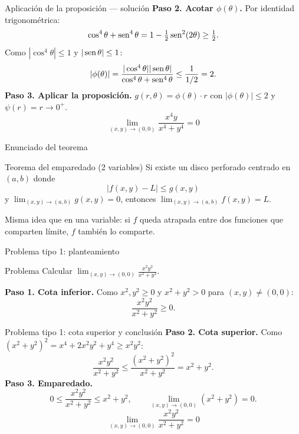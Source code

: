\documentclass[11pt,aspectratio=169]{beamer}
\begin{document}
\begin{frame}{Aplicación de la proposición --- solución}
  \textbf{Paso 2. Acotar $\phi(\theta)$.} Por identidad trigonométrica:
  \[
    \cos^4\theta+\operatorname{sen}^4\theta=1-\tfrac12\operatorname{sen}^2(2\theta)\ge\tfrac12.
  \]
  \pause
  Como $|\cos^4\theta|\le 1$ y $|\operatorname{sen}\theta|\le 1$:
  \[
    |\phi(\theta)|=\frac{|\cos^4\theta||\operatorname{sen}\theta|}{\cos^4\theta+\operatorname{sen}^4\theta}\le\frac{1}{1/2}=2.
  \]
  \pause
  \textbf{Paso 3. Aplicar la proposición.} $g(r,\theta)=\phi(\theta)\cdot r$ con $|\phi(\theta)|\le 2$ y $\psi(r)=r\to 0^+$.
  \pause
  \[
    \boxed{\lim_{(x,y)\to(0,0)}\frac{x^4y}{x^4+y^4}=0}
  \]
\end{frame}


\begin{frame}{Enunciado del teorema}
  \begin{block}{Teorema del emparedado (2 variables)}
    Si existe un disco perforado centrado en $(a,b)$ donde
    \[
      |f(x,y)-L|\le g(x,y)
    \]
    y $\displaystyle\lim_{(x,y)\to(a,b)} g(x,y)=0$, entonces $\displaystyle\lim_{(x,y)\to(a,b)} f(x,y)=L$.
  \end{block}
  \pause
  \begin{center}
  \normalsize Misma idea que en una variable: si $f$ queda atrapada entre dos funciones que comparten límite, $f$ también lo comparte.
  \end{center}
  \pause
\end{frame}

\begin{frame}{Problema tipo 1: planteamiento}
  \begin{block}{Problema}
    Calcular $\displaystyle\lim_{(x,y)\to(0,0)}\frac{x^2y^2}{x^2+y^2}$.
  \end{block}
  \pause
  \textbf{Paso 1. Cota inferior.} Como $x^2,y^2\ge 0$ y $x^2+y^2>0$ para $(x,y)\neq(0,0)$:
  \[
    \frac{x^2y^2}{x^2+y^2}\ge 0.
  \]
\end{frame}

\begin{frame}{Problema tipo 1: cota superior y conclusión}
  \textbf{Paso 2. Cota superior.} Como $(x^2+y^2)^2=x^4+2x^2y^2+y^4\ge x^2y^2$:
  \[
    \frac{x^2y^2}{x^2+y^2}\le\frac{(x^2+y^2)^2}{x^2+y^2}=x^2+y^2.
  \]
  \pause
  \textbf{Paso 3. Emparedado.}
  \[
    0\le\frac{x^2y^2}{x^2+y^2}\le x^2+y^2,
    \qquad
    \lim_{(x,y)\to(0,0)}(x^2+y^2)=0.
  \]
  \pause
  \[
    \boxed{\lim_{(x,y)\to(0,0)}\frac{x^2y^2}{x^2+y^2}=0}
  \]
\end{frame}
\end{document}
